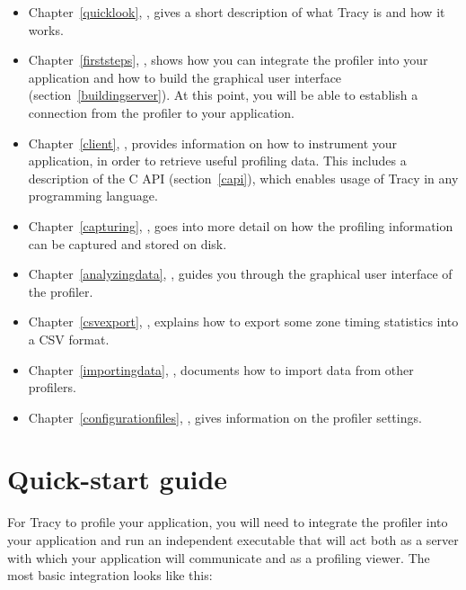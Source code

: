 \documentclass[hidelinks,titlepage,a4paper]{article}
\begin{document}
\begin{itemize}
\item Chapter~\ref{quicklook}, \emph{}, gives a short description of what Tracy is and how it works.
\item Chapter~\ref{firststeps}, \emph{}, shows how you can integrate the profiler into your application and how to build the graphical user interface (section~\ref{buildingserver}). At this point, you will be able to establish a connection from the profiler to your application.
\item Chapter~\ref{client}, \emph{}, provides information on how to instrument your application, in order to retrieve useful profiling data. This includes a description of the C API (section~\ref{capi}), which enables usage of Tracy in any programming language.
\item Chapter~\ref{capturing}, \emph{}, goes into more detail on how the profiling information can be captured and stored on disk.
\item Chapter~\ref{analyzingdata}, \emph{}, guides you through the graphical user interface of the profiler.
\item Chapter~\ref{csvexport}, \emph{}, explains how to export some zone timing statistics into a CSV format.
\item Chapter~\ref{importingdata}, \emph{}, documents how to import data from other profilers.
\item Chapter~\ref{configurationfiles}, \emph{}, gives information on the profiler settings.
\end{itemize}

\section*{Quick-start guide}

For Tracy to profile your application, you will need to integrate the profiler into your application and run an independent executable that will act both as a server with which your application will communicate and as a profiling viewer. The most basic integration looks like this:
\end{document}
